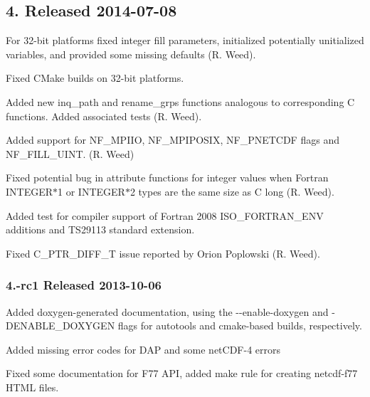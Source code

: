 \subsection*{4. Released 2014-\/07-\/08}


\begin{DoxyItemize}
\item For 32-\/bit platforms fixed integer fill parameters, initialized potentially unitialized variables, and provided some missing defaults (R. Weed).
\item Fixed C\+Make builds on 32-\/bit platforms.
\item Added new {\ttfamily inq\+\_\+path} and {\ttfamily rename\+\_\+grps} functions analogous to corresponding C functions. Added associated tests (R. Weed).
\item Added support for N\+F\+\_\+\+M\+P\+I\+IO, {\ttfamily N\+F\+\_\+\+M\+P\+I\+P\+O\+S\+IX}, {\ttfamily N\+F\+\_\+\+P\+N\+E\+T\+C\+DF} flags and {\ttfamily N\+F\+\_\+\+F\+I\+L\+L\+\_\+\+U\+I\+NT}. (R. Weed)
\item Fixed potential bug in attribute functions for integer values when Fortran {\ttfamily I\+N\+T\+E\+G\+E\+R$\ast$1} or {\ttfamily I\+N\+T\+E\+G\+E\+R$\ast$2} types are the same size as C long (R. Weed).
\item Added test for compiler support of Fortran 2008 {\ttfamily I\+S\+O\+\_\+\+F\+O\+R\+T\+R\+A\+N\+\_\+\+E\+NV} additions and T\+S29113 standard extension.
\item Fixed {\ttfamily C\+\_\+\+P\+T\+R\+\_\+\+D\+I\+F\+F\+\_\+T} issue reported by Orion Poplowski (R. Weed).
\end{DoxyItemize}

\subsubsection*{4.-\/rc1 Released 2013-\/10-\/06}


\begin{DoxyItemize}
\item Added doxygen-\/generated documentation, using the {\ttfamily -\/-\/enable-\/doxygen} and {\ttfamily -\/\+D\+E\+N\+A\+B\+L\+E\+\_\+\+D\+O\+X\+Y\+G\+EN} flags for autotools and cmake-\/based builds, respectively.
\item Added missing error codes for D\+AP and some net\+C\+D\+F-\/4 errors
\item Fixed some documentation for F77 A\+PI, added make rule for creating netcdf-\/f77 H\+T\+ML files.
\end{DoxyItemize}

